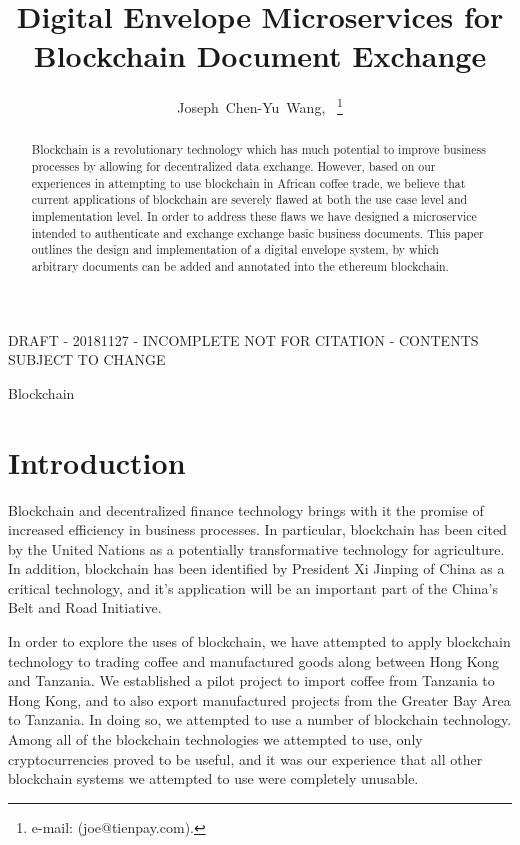 \documentclass[journal]{IEEEtran}
\begin{document}
\title{Digital Envelope Microservices for Blockchain Document Exchange}
\author{Joseph~Chen-Yu~Wang,~
\thanks{e-mail: (joe@tienpay.com).}}
\maketitle

DRAFT - 20181127 - INCOMPLETE NOT FOR CITATION - CONTENTS SUBJECT TO CHANGE

\begin{abstract}
Blockchain is a revolutionary technology which has much potential to
improve business processes by allowing for decentralized data
exchange.  However, based on our experiences in attempting to use
blockchain in African coffee trade, we believe that current
applications of blockchain are severely flawed at both the use case
level and implementation level.  In order to address these flaws
we have designed a microservice intended to authenticate and exchange
exchange basic business documents.  This paper outlines the design and
implementation of a digital envelope system, by which arbitrary
documents can be added and annotated into the ethereum blockchain.
\end{abstract}


\begin{IEEEkeywords}
Blockchain
\end{IEEEkeywords}

\section{Introduction}
Blockchain and decentralized finance technology brings with it the
promise of increased efficiency in business processes.  In particular,
blockchain has been cited by the United Nations as a potentially
transformative technology for agriculture.\cite{fao:blockchain} In
addition, blockchain has been identified by President Xi Jinping of
China as a critical technology, and it's application will be an
important part of the China's Belt and Road Initiative.

In order to explore the uses of blockchain, we have attempted to apply
blockchain technology to trading coffee and manufactured goods along
between Hong Kong and Tanzania.  We established a pilot project to
import coffee from Tanzania to Hong Kong, and to also export
manufactured projects from the Greater Bay Area to Tanzania.  In doing
so, we attempted to use a number of blockchain technology.  Among all
of the blockchain technologies we attempted to use, only
cryptocurrencies proved to be useful, and it was our experience that
all other blockchain systems we attempted to use were completely
unusable.
\end{document}
